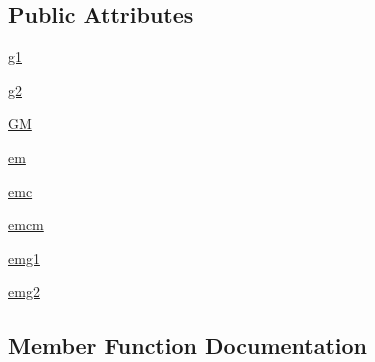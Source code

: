 \subsection*{Public Attributes}
\begin{DoxyCompactItemize}
\item 
\hyperlink{classnetworkx_1_1algorithms_1_1isomorphism_1_1tests_1_1test__vf2userfunc_1_1TestEdgeMatch__MultiGraph_af64090142ab4b2351b2baa5ae2b0e320}{g1}
\item 
\hyperlink{classnetworkx_1_1algorithms_1_1isomorphism_1_1tests_1_1test__vf2userfunc_1_1TestEdgeMatch__MultiGraph_a593e462f8c83a693dc9b337a59787a71}{g2}
\item 
\hyperlink{classnetworkx_1_1algorithms_1_1isomorphism_1_1tests_1_1test__vf2userfunc_1_1TestEdgeMatch__MultiGraph_ae148c20831edecadbee5b25944aa5a99}{GM}
\item 
\hyperlink{classnetworkx_1_1algorithms_1_1isomorphism_1_1tests_1_1test__vf2userfunc_1_1TestEdgeMatch__MultiGraph_a4d1614097d1aa89922d0e020ad2314b1}{em}
\item 
\hyperlink{classnetworkx_1_1algorithms_1_1isomorphism_1_1tests_1_1test__vf2userfunc_1_1TestEdgeMatch__MultiGraph_aabb6e093ef7d57d7e84d7d7bb1d8d308}{emc}
\item 
\hyperlink{classnetworkx_1_1algorithms_1_1isomorphism_1_1tests_1_1test__vf2userfunc_1_1TestEdgeMatch__MultiGraph_ae14232a5f23be0d0fdd94c0b721e16b6}{emcm}
\item 
\hyperlink{classnetworkx_1_1algorithms_1_1isomorphism_1_1tests_1_1test__vf2userfunc_1_1TestEdgeMatch__MultiGraph_aea0858d80b9dc356fc62136ca7af2acb}{emg1}
\item 
\hyperlink{classnetworkx_1_1algorithms_1_1isomorphism_1_1tests_1_1test__vf2userfunc_1_1TestEdgeMatch__MultiGraph_a62b41a5722190ba9c16867fa33a584b6}{emg2}
\end{DoxyCompactItemize}


\subsection{Member Function Documentation}
\mbox{\label{classnetworkx_1_1algorithms_1_1isomorphism_1_1tests_1_1test__vf2userfunc_1_1TestEdgeMatch__MultiGraph_a046863cfdc308f23efe3fff2d99472d2}} 
